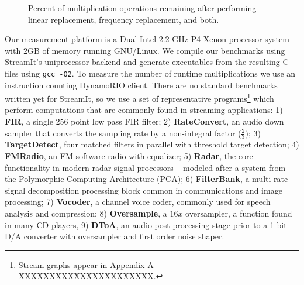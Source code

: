 \begin{figure}[t]
\center
\epsfxsize=3.2in
\vspace{-6pt}
\caption{Percent of multiplication operations remaining after performing linear replacement, frequency replacement, and both.}
\label{fig:linear-freq-both}
\vspace{-12pt}
\end{figure}


Our measurement platform is a Dual Intel 2.2 GHz P4 Xenon processor system 
with 2GB of memory running GNU/Linux. We compile our benchmarks using StreamIt's uniprocessor backend
and generate executables from the resulting C files using {\tt gcc -O2}.
To measure the number of runtime multiplications we use an instruction counting 
DynamoRIO\cite{dynamo99} client.
There are no standard benchmarks written yet for StreamIt, so we use
a set of representative programs\footnote{Stream graphs appear in Appendix A XXXXXXXXXXXXXXXXXXXXXX.}
which perform computations that are commonly found in streaming applications:
1) {\bf FIR}, a single 256 point low pass FIR filter; 
2) {\bf RateConvert}, an audio down sampler that converts the 
sampling rate by a non-integral factor ($\frac{2}{3}$); 
3) {\bf TargetDetect}, four matched filters in parallel with threshold target detection; 
4) {\bf FMRadio}, an FM software radio with equalizer;
5) {\bf Radar}, the core functionality in modern radar signal processors 
-- modeled after a system from the Polymorphic Computing Architecture (PCA);
6) {\bf FilterBank}, a multi-rate signal decomposition 
processing block common in communications and image processing;
7) {\bf Vocoder}, a channel voice coder, commonly used for speech analysis and compression;
8) {\bf Oversample}, a $16x$ oversampler, a function found in many CD players,
9) {\bf DToA}, an audio post-processing stage prior to a 1-bit D/A converter 
with oversampler and first order noise shaper.

